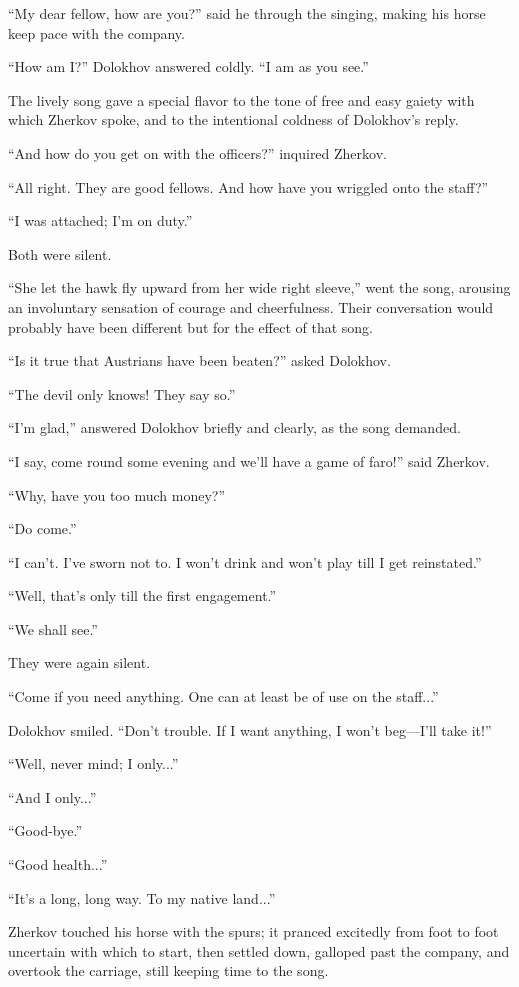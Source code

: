 ``My dear fellow, how are you?'' said he through the singing,
making his horse keep pace with the company.

``How am I?'' Dolokhov answered coldly. ``I am as you see.''

The lively song gave a special flavor to the tone of free and
easy gaiety with which Zherkov spoke, and to the intentional
coldness of Dolokhov's reply.

``And how do you get on with the officers?'' inquired Zherkov.

``All right. They are good fellows. And how have you wriggled
onto the staff?''

``I was attached; I'm on duty.''

Both were silent.

``She let the hawk fly upward from her wide right sleeve,'' went
the song, arousing an involuntary sensation of courage and
cheerfulness. Their conversation would probably have been
different but for the effect of that song.

``Is it true that Austrians have been beaten?'' asked Dolokhov.

``The devil only knows! They say so.''

``I'm glad,'' answered Dolokhov briefly and clearly, as the song
demanded.

``I say, come round some evening and we'll have a game of faro!''
said Zherkov.

``Why, have you too much money?''

``Do come.''

``I can't. I've sworn not to. I won't drink and won't play till I
get reinstated.''

``Well, that's only till the first engagement.''

``We shall see.''

They were again silent.

``Come if you need anything. One can at least be of use on the
staff...''

Dolokhov smiled. ``Don't trouble. If I want anything, I won't
beg---I'll take it!''

``Well, never mind; I only...''

``And I only...''

``Good-bye.''

``Good health...''

``It's a long, long way. To my native land...''

Zherkov touched his horse with the spurs; it pranced excitedly
from foot to foot uncertain with which to start, then settled
down, galloped past the company, and overtook the carriage, still
keeping time to the song.

